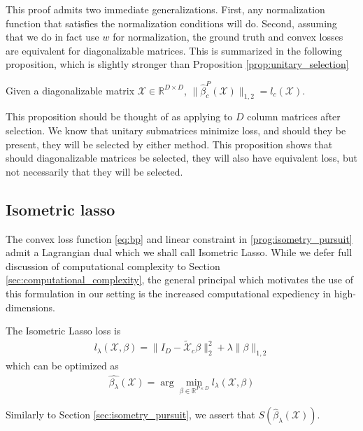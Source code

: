 This proof admits two immediate generalizations.
First, any normalization function that satisfies the normalization conditions will do.
Second, assuming that we do in fact use $w$ for normalization, the ground truth and convex losses are equivalent for diagonalizable matrices.
This is summarized in the following proposition, which is slightly stronger than Proposition \ref{prop:unitary_selection}
 \begin{proposition}
 Given a diagonalizable matrix $\mathcal X \in \mathbb R^{D \times D}$, $\|\widehat \beta_c^P(\mathcal X)\|_{1,2} = l_c (\mathcal X)$.
 \end{proposition}
This proposition should be thought of as applying to $D$ column matrices after selection.
We know that unitary submatrices minimize loss, and should they be present, they will be selected by either method. %
This proposition shows that should diagonalizable matrices be selected, they will also have equivalent loss, but not necessarily that they will be selected.



\subsection{Isometric lasso}

The convex loss function \ref{eq:bp} and linear constraint in \ref{prog:isometry_pursuit} admit a Lagrangian dual which we shall call Isometric Lasso.
While we defer full discussion of computational complexity to Section \ref{sec:computational_complexity}, the general principal which motivates the use of this formulation in our setting is the increased computational expediency in high-dimensions.

The Isometric Lasso loss is
\begin{align}
l_\lambda (\mathcal X, \beta) =  \|I_D -  \tilde{ \mathcal X}_c \beta\|_2^2 +  \lambda \| \beta \|_{1,2}
\end{align}
which can be optimized as
\begin{align}
\label{prog:isometric_lasso}
\hat {\beta_{\lambda}} (\mathcal X) = \arg \min_{\beta \in \mathbb R^{P \times D}} l_\lambda (\mathcal X, \beta)
\end{align}

Similarly to Section \ref{sec:isometry_pursuit}, we assert that $S(\widehat {\beta}_{\lambda} (\mathcal X))$.


